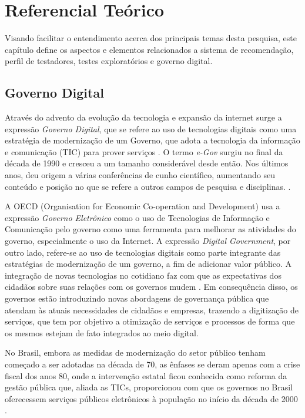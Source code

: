 \chapter[Referencial Teórico]{Referencial Teórico}
Visando facilitar o entendimento acerca dos principais temas desta pesquisa, este capítulo define os aspectos e elementos relacionados a sistema de
recomendação, perfil de testadores, testes exploratórios e governo digital.
\section{Governo Digital}

Através do advento da evolução da tecnologia e expansão da internet surge a expressão \textit{Governo Digital},
que se refere ao uso de tecnologias digitais como uma estratégia de modernização de um Governo, que adota a tecnologia
da informação e comunicação (TIC) para prover serviços \cite{fang2002government}. O termo \textit{e-Gov} surgiu no final da década de 1990 e cresceu a um tamanho considerável desde então. Nos últimos
anos, deu origem a várias conferências de cunho científico, aumentando seu conteúdo e posição no que se refere a outros
campos de pesquisa e disciplinas. \cite{gronlund2005introducing}.

A OECD (Organisation for Economic Co-operation and Development) usa a expressão \textit {Governo Eletrônico} como o uso de Tecnologias de Informação e
Comunicação pelo governo como uma ferramenta para melhorar as atividades do governo, especialmente o uso da Internet. A expressão
\textit{Digital Government}, por outro lado, refere-se ao uso de tecnologias digitais como parte integrante das estratégias de modernização de um governo,
a fim de adicionar valor público. A integração de novas tecnologias no cotidiano faz com que as expectativas dos cidadãos sobre suas relações com os governos
mudem \cite{oecd}. Em consequência disso, os governos estão introduzindo novas abordagens de governança pública que atendam às atuais necessidades de
cidadãos e empresas, trazendo a digitização de serviços, que tem por objetivo a otimização de serviços e processos de forma que os mesmos estejam de fato
integrados ao meio digital.

No Brasil, embora as medidas de modernização do setor público tenham começado a ser adotadas na década de 70, as ênfases se deram apenas com a crise fiscal
dos anos 80, onde a intervenção estatal ficou conhecida como reforma da gestão pública que, aliada as TICs, proporcionou com que os governos no Brasil oferecessem
serviços públicos eletrônicos à população no início da década de 2000 \cite{przeybilovicz2015desenvolvimento}.

